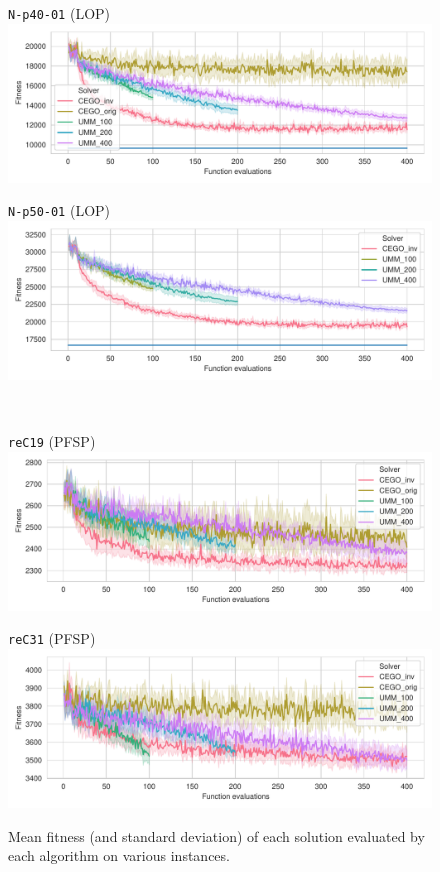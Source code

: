 \documentclass[sigconf,dvipsnames]{acmart}
\begin{document}
\begin{figure}[tb]
\begin{minipage}{0.49\linewidth}
  \texttt{N-p40-01} (LOP)\\[-0.5ex]
  \includegraphics[width=\textwidth]{../img/fitness_lop_RandB_N-p40-01}
\end{minipage}
\begin{minipage}{0.49\linewidth}
  \texttt{N-p50-01} (LOP)\\[-0.5ex]
  \includegraphics[width=\textwidth]{../img/fitness_lop_RandB_N-p50-01}
\end{minipage}
\\
\begin{minipage}{0.49\linewidth}
  \texttt{reC19} (PFSP)\\[-0.5ex]
  \includegraphics[width=\textwidth]{../img/fitness_pfsp_rec19_txt}
\end{minipage}
\begin{minipage}{0.49\linewidth}
  \texttt{reC31} (PFSP)\\[-0.5ex]
  \includegraphics[width=\textwidth]{../img/fitness_pfsp_rec31_txt}
\end{minipage}
\label{fig:results}
\caption{Mean fitness  (and standard deviation)  of each solution evaluated by each algorithm on various instances.\label{fig:rec05}}
\end{figure}
\end{document}
